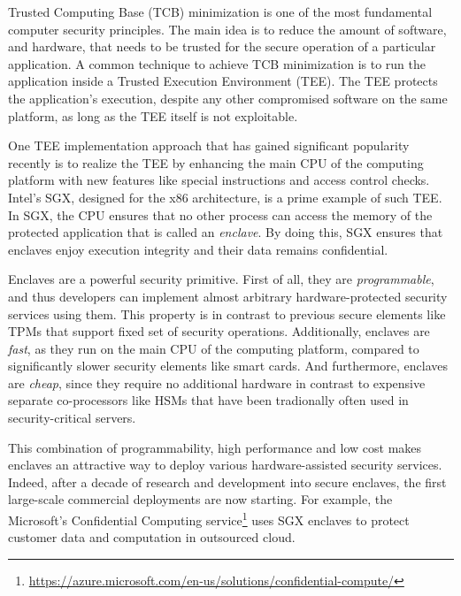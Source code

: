 
\vspace{10pt}

Trusted Computing Base (TCB) minimization is one of the most fundamental computer security principles. The main idea is to reduce the amount of software, and hardware, that needs to be trusted for the secure operation of a particular application. A common technique to achieve TCB minimization is to run the application inside a Trusted Execution Environment (TEE). The TEE protects the application's execution, despite any other compromised software on the same platform, as long as the TEE itself is not exploitable. 

One TEE implementation approach that has gained significant popularity recently is to realize the TEE by enhancing the main CPU of the computing platform with new features like special instructions and access control checks. Intel's SGX, designed for the x86 architecture, is a prime example of such TEE. In SGX, the CPU ensures that no other process can access the memory of the protected application that is called an \emph{enclave}. By doing this, SGX ensures that enclaves enjoy execution integrity and their data remains confidential.  

Enclaves are a powerful security primitive. First of all, they are \emph{programmable}, and thus developers can implement almost arbitrary hardware-protected security services using them. This property is in contrast to previous secure elements like TPMs that support fixed set of security operations. Additionally, enclaves are \emph{fast}, as they run on the main CPU of the computing platform, compared to significantly slower security elements like smart cards. And furthermore, enclaves are \emph{cheap}, since they require no additional hardware in contrast to expensive separate co-processors like HSMs that have been tradionally often used in security-critical servers. 

This combination of programmability, high performance and low cost makes enclaves an attractive way to deploy various hardware-assisted security services. Indeed, after a decade of research and development into secure enclaves, the first large-scale commercial deployments are now starting. For example, the Microsoft's Confidential Computing service\footnote{\url{https://azure.microsoft.com/en-us/solutions/confidential-compute/}} uses SGX enclaves to protect customer data and computation in outsourced cloud.%

